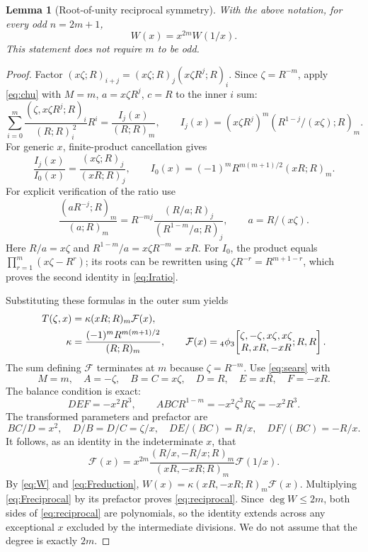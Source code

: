 \documentclass[11pt]{article}
\newtheorem{lemma}{Lemma}
\newcommand{\qp}[3]{(#1;#2)_{#3}}
\newcommand{\F}[2]{ {}_4\phi_3\!\left[\begin{matrix}#1\\#2\end{matrix};R,R\right] }
\begin{document}
\begin{lemma}[Root-of-unity reciprocal symmetry]\label{lem:reciprocal}
With the above notation, for every odd $n=2m+1$,
\begin{equation}\label{eq:reciprocal}
 W(x)=x^{2m}W(1/x).
\end{equation}
This statement does not require $m$ to be odd.
\end{lemma}
\begin{proof}
Factor $\qp{x\zeta}{R}{i+j}=\qp{x\zeta}{R}{j}
\qp{x\zeta R^j}{R}{i}$. Since $\zeta=R^{-m}$, apply \eqref{eq:chu} with
$M=m$, $a=x\zeta R^j$, $c=R$ to the inner $i$ sum:
\begin{equation}\label{eq:Ij}
 \sum_{i=0}^m\frac{\qp{\zeta,x\zeta R^j}{R}{i}}{\qp{R}{R}{i}^{\,2}}R^i
 =\frac{I_j(x)}{\qp{R}{R}{m}},\qquad
 I_j(x)=(x\zeta R^j)^m\qp{R^{1-j}/(x\zeta)}{R}{m}.
\end{equation}
For generic $x$, finite-product cancellation gives
\begin{equation}\label{eq:Iratio}
 \frac{I_j(x)}{I_0(x)}=
 \frac{\qp{x\zeta}{R}{j}}{\qp{xR}{R}{j}},\qquad
 I_0(x)=(-1)^m R^{m(m+1)/2}\qp{xR}{R}{m}.
\end{equation}
For explicit verification of the ratio use
\[
 \frac{\qp{aR^{-j}}{R}{m}}{\qp{a}{R}{m}}
 =R^{-mj}\frac{\qp{R/a}{R}{j}}{\qp{R^{1-m}/a}{R}{j}},
 \qquad a=R/(x\zeta).
\]
Here $R/a=x\zeta$ and $R^{1-m}/a=x\zeta R^{-m}=xR$.
For $I_0$, the product equals $\prod_{r=1}^m(x\zeta-R^r)$; its roots can
be rewritten using $\zeta R^{-r}=R^{m+1-r}$, which proves the second
identity in \eqref{eq:Iratio}.

Substituting these formulas in the outer sum yields
\begin{align}\label{eq:Freduction}
 T(\zeta,x)&=\kappa\qp{xR}{R}{m}\mathcal F(x),\notag\\
 \kappa&=\frac{(-1)^m R^{m(m+1)/2}}{\qp{R}{R}{m}},\qquad
 \mathcal F(x)=\F{\zeta,-\zeta,x\zeta,x\zeta}{R,xR,-xR}.
\end{align}
The sum defining $\mathcal F$ terminates at $m$ because $\zeta=R^{-m}$.
Use \eqref{eq:sears} with
\[
 M=m,\quad A=-\zeta,\quad B=C=x\zeta,\quad
 D=R,\quad E=xR,\quad F=-xR.
\]
The balance condition is exact:
\[
 DEF=-x^2R^3,
 \qquad ABC R^{1-m}=-x^2\zeta^3R\zeta=-x^2R^3.
\]
The transformed parameters and prefactor are
\[
 BC/D=x^2,\quad D/B=D/C=\zeta/x,\quad
 DE/(BC)=R/x,\quad DF/(BC)=-R/x.
\]
It follows, as an identity in the indeterminate $x$, that
\begin{equation}\label{eq:Freciprocal}
 \mathcal F(x)=x^{2m}
 \frac{\qp{R/x,-R/x}{R}{m}}{\qp{xR,-xR}{R}{m}}\mathcal F(1/x).
\end{equation}
By \eqref{eq:W} and \eqref{eq:Freduction},
$W(x)=\kappa\qp{xR,-xR}{R}{m}\mathcal F(x)$.
Multiplying \eqref{eq:Freciprocal} by its prefactor proves
\eqref{eq:reciprocal}. Since $\deg W\leq2m$, both sides of
\eqref{eq:reciprocal} are polynomials, so the identity extends across any
exceptional $x$ excluded by the intermediate divisions. We do not assume
that the degree is exactly $2m$.
\end{proof}
\end{document}
